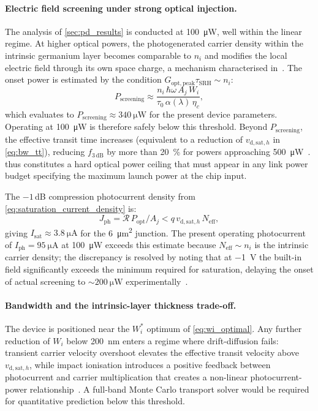 \paragraph{Electric field screening under strong optical injection.}
The analysis of \cref{sec:pd_results} is conducted at \SI{100}{\micro\watt},
well within the linear regime. At higher optical powers, the photogenerated
carrier density within the intrinsic germanium layer becomes comparable to $n_i$
and modifies the local electric field through its own space charge, a mechanism
characterised in~\cite{Alasio2024}. The onset power is estimated by the condition
$G_{\mathrm{opt,peak}}\tau_{\mathrm{SRH}}\sim n_i$:
\begin{equation}
    P_{\mathrm{screening}}
    \approx \frac{n_i\,\hbar\omega\,A_j\,W_i}{\tau_0\,\alpha(\lambda)\,\eta_c},
    \label{eq:p_screening}
\end{equation}
which evaluates to $P_{\mathrm{screening}}\approx\SI{340}{\micro\watt}$ for the
present device parameters. Operating at \SI{100}{\micro\watt} is therefore safely
below this threshold. Beyond $P_{\mathrm{screening}}$, the effective transit
time increases (equivalent to a reduction of $v_{\mathrm{d,sat},h}$ in
\cref{eq:bw_tt}), reducing $f_{3\,\mathrm{dB}}$ by more than \SI{20}{\percent}
for powers approaching \SI{500}{\micro\watt}~\cite{Alasio2024}. 
thus constitutes a hard optical power ceiling that must appear in any link power
budget specifying the maximum launch power at the chip input.

The $-1$\,dB compression photocurrent density from \cref{eq:saturation_current_density}
is:
\begin{equation}
    J_{\mathrm{ph}} = \mathcal{R}\,P_{\mathrm{opt}}/A_j
    < q\,v_{\mathrm{d,sat},h}\,N_{\mathrm{eff}},
    \label{eq:saturation_current_density}
\end{equation}
giving $I_{\mathrm{sat}}\approx\SI{3.8}{\micro\ampere}$ for the
\SI{6}{\micro\metre\squared} junction. The present operating photocurrent of
$I_{\mathrm{ph}}=\SI{95}{\micro\ampere}$ at \SI{100}{\micro\watt} exceeds this
estimate because $N_{\mathrm{eff}}\sim n_i$ is the intrinsic carrier density;
the discrepancy is resolved by noting that at \SI{-1}{\volt} the built-in field
significantly exceeds the minimum required for saturation, delaying the onset
of actual screening to $\sim\SI{200}{\micro\watt}$ experimentally~\cite{Alasio2024}.

\paragraph{Bandwidth and the intrinsic-layer thickness trade-off.}
The device is positioned near the $W_i^*$ optimum of \cref{eq:wi_optimal}.
Any further reduction of $W_i$ below \SI{200}{\nano\metre} enters a regime
where drift-diffusion fails: transient carrier velocity overshoot elevates the
effective transit velocity above $v_{\mathrm{d,sat},h}$, while impact ionisation
introduces a positive feedback between photocurrent and carrier multiplication
that creates a non-linear photocurrent-power relationship~\cite{Alasio2024}.
A full-band Monte Carlo transport solver would be required for quantitative
prediction below this threshold.

